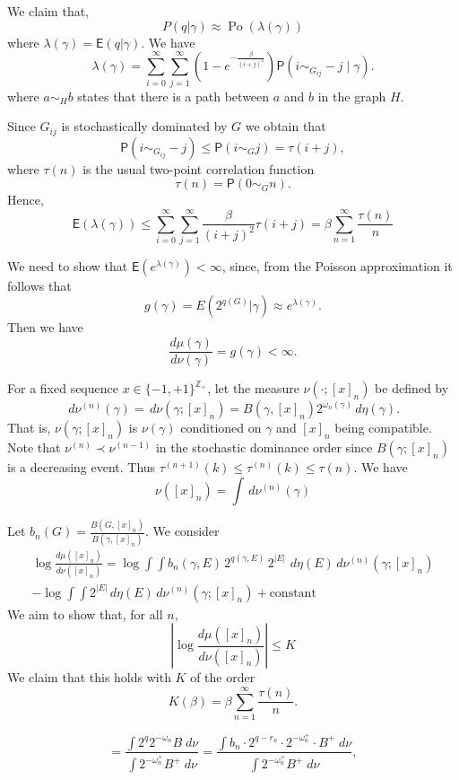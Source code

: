 \documentclass[11pt, a4paper, oneside]{scrartcl}
\theoremstyle{definition}
\theoremstyle{remark}
\renewcommand{\d}{\,d}
\providecommand{\ZZ}{\mathbb{Z}}
\providecommand{\ol}{\overline}
\def\ii#1{^{(#1)}}
\providecommand{\E}{\mathsf{E}}
\renewcommand{\P}{\mathsf{P}}
\providecommand{\w}{\omega}
\begin{document}
We claim that,
$$
P(q|\gamma)\approx \operatorname{Po}(\lambda(\gamma))
$$
where $\lambda(\gamma) = \mathsf E(q|\gamma)$. We have
\[
\lambda(\gamma) = \sum_{i=0}^{\infty} \sum_{j=1}^{\infty} (1-e^{-\frac{\beta}{(i+j)^2}})
\mathsf P(i\sim_{G_{ij}} -j\mid \gamma).
\]
where $a\sim_H b$ states that there is a path between $a$ and $b$ in the graph $H$.

Since $G_{ij}$ is stochastically dominated by $G$ we obtain that
\[
\P(i \sim_{G_{ij}} -j) \le \P(i \sim_G j) = \tau(i+j),
\]
where $\tau(n)$ is the usual two-point correlation function
\[
\tau(n) = \mathsf P(0\sim_G n).
\]
Hence,
\[
\mathsf E(\lambda(\gamma)) \le
\sum_{i=0}^\infty
\sum_{j=1}^\infty \frac\beta{(i+j)^2} \tau(i+j) =
\beta \sum_{n=1}^\infty \frac {\tau(n)}n
\]

We need to show that $\E(e^{\lambda(\gamma)})<\infty$, since, from
the Poisson approximation it follows that
$$
g(\gamma)=E(2^{q(G)}|\gamma) \approx e^{\lambda(\gamma)}.
$$
Then we have
$$\frac{d\mu(\gamma)}{d\nu(\gamma)}=g(\gamma) < \infty. $$


For a fixed sequence $x\in\{-1,+1\}^{\ZZ_+}$,
let the measure $\nu(\cdot;[x]_n)$ be defined by
\[
\d\nu\ii n(\gamma) =
\d\nu(\gamma; [x]_n) =
B(\gamma,[x]_n) 2^{\ol\w_n(\gamma)} \d\eta(\gamma).
\]
That is, $\nu(\gamma; [x]_n)$ is $\nu(\gamma)$ conditioned on $\gamma$ and
$[x]_n$ being compatible. Note that $\nu\ii n \prec \nu\ii {n-1}$ in the
stochastic dominance order since $B(\gamma; [x]_n)$ is a decreasing event. Thus
$\tau\ii {n+1} (k) \le \tau\ii n (k) \le \tau(n)$. We have
\[
\nu([x]_n) = \int \d\nu\ii n(\gamma)
\]

Let $b_n(G)=\frac{B(G,[x]_n)}{B(\gamma,[x]_n)}$.
We consider
\begin{gather*}
\log \frac{d\mu([x]_n)}{d\nu([x]_n)}
=
\log {\int \int b_n(\gamma,E)\, 2^{q(\gamma,E)} \, 2^{|E|}\, \d\eta(E)\, d\nu\ii n (\gamma; [x]_n)} \\
-  \log {\int \int 2^{|E|} \d\eta(E)\, d\nu\ii n(\gamma; [x]_n) } + \text{constant}
\end{gather*}
We aim to show that, for all $n$,
\begin{equation}
  |\log \frac{d\mu([x]_n)}{d\nu([x]_n)}| \le K
\end{equation}
We claim that this holds with $K$ of the order
\[
K(\beta) = \beta \sum_{n=1}^\infty \frac{\tau(n)}{n}.
\]

\[
=\frac{\int2^q 2^{-\omega_n} B\; d\nu}{\int 2^{-\omega_n^+} B^+\; d\nu }
=\frac{\int b_n \cdot 2^{q-r_n}\cdot 2^{-\omega_n^+}\cdot B^+\; d\nu}{\int 2^{-\omega_n^+} B^+\; d\nu},
\]
\end{document}

